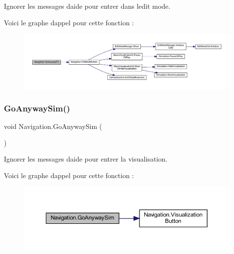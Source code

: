 Ignorer les messages d\textquotesingle{}aide pour entrer dans l\textquotesingle{}edit mode. 

Voici le graphe d\textquotesingle{}appel pour cette fonction \+:
\nopagebreak
\begin{figure}[H]
\begin{center}
\leavevmode
\includegraphics[width=350pt]{class_navigation_a17942535e76d66a1d290f9e7a2bc03ec_cgraph}
\end{center}
\end{figure}
\mbox{\label{class_navigation_a4ea15dd4ea6a5789b4786150d534fc10}} 
\subsubsection{\texorpdfstring{Go\+Anyway\+Sim()}{GoAnywaySim()}}
{\footnotesize\ttfamily void Navigation.\+Go\+Anyway\+Sim (\begin{DoxyParamCaption}{ }\end{DoxyParamCaption})\hspace{0.3cm}{\ttfamily [inline]}}



Ignorer les messages d\textquotesingle{}aide pour entrer la visualisation. 

Voici le graphe d\textquotesingle{}appel pour cette fonction \+:
\nopagebreak
\begin{figure}[H]
\begin{center}
\leavevmode
\includegraphics[width=350pt]{class_navigation_a4ea15dd4ea6a5789b4786150d534fc10_cgraph}
\end{center}
\end{figure}
\mbox{\label{class_navigation_a9a7bb527269069e0c083ef70291d4fb3}} 
